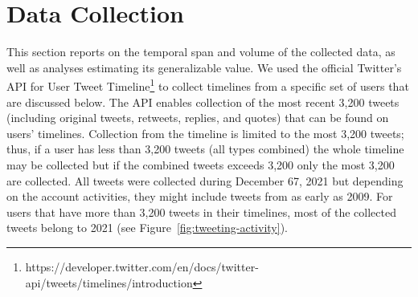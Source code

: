 \documentclass[letterpaper]{article} %
\begin{document}
\section{Data Collection}

This section reports on the temporal span and volume of the collected data, as well as analyses estimating its generalizable value.
We used the official Twitter's API for User Tweet Timeline\footnote{https://developer.twitter.com/en/docs/twitter-api/tweets/timelines/introduction} to collect timelines from a specific set of users that are discussed below. The API enables collection of the most recent 3,200 tweets (including original tweets, retweets, replies, and quotes) that can be found on users' timelines. Collection from the timeline is limited to the most 3,200 tweets; thus, if a user has less than 3,200 tweets (all types combined) the whole timeline may be collected but if the combined tweets exceeds 3,200 only the most 3,200 are collected.  All tweets were collected during December 67, 2021 but depending on the account activities, they might include tweets from as early as 2009. For   users that have  more than 3,200 tweets in their timelines, most of the collected tweets  belong to 2021 (see   Figure~\ref{fig:tweeting-activity}).



\end{document}
